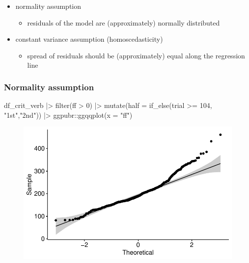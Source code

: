 \documentclass[
  letterpaper,
  DIV=11,
  numbers=noendperiod]{scrartcl}
\newenvironment{Shaded}{\begin{snugshade}}{\end{snugshade}}
\newcommand{\AttributeTok}[1]{\textcolor[rgb]{0.40,0.45,0.13}{#1}}
\newcommand{\DecValTok}[1]{\textcolor[rgb]{0.68,0.00,0.00}{#1}}
\newcommand{\FunctionTok}[1]{\textcolor[rgb]{0.28,0.35,0.67}{#1}}
\newcommand{\NormalTok}[1]{\textcolor[rgb]{0.00,0.23,0.31}{#1}}
\newcommand{\SpecialCharTok}[1]{\textcolor[rgb]{0.37,0.37,0.37}{#1}}
\newcommand{\StringTok}[1]{\textcolor[rgb]{0.13,0.47,0.30}{#1}}
\providecommand{\tightlist}{%
  \setlength{\itemsep}{0pt}\setlength{\parskip}{0pt}}\usepackage{longtable,booktabs,array}
\begin{document}
\begin{itemize}
\tightlist
\item
  normality assumption

  \begin{itemize}
  \tightlist
  \item
    residuals of the model are (approximately) normally distributed
  \end{itemize}
\item
  constant variance assumption (homoscedasticity)

  \begin{itemize}
  \tightlist
  \item
    spread of residuals should be (approximately) equal along the
    regression line
  \end{itemize}
\end{itemize}

\hypertarget{normality-assumption}{%
\subsubsection{Normality assumption}\label{normality-assumption}}

\begin{Shaded}
\begin{Highlighting}[]
\NormalTok{df\_crit\_verb }\SpecialCharTok{|\textgreater{}} 
  \FunctionTok{filter}\NormalTok{(ff }\SpecialCharTok{\textgreater{}} \DecValTok{0}\NormalTok{) }\SpecialCharTok{|\textgreater{}} 
  \FunctionTok{mutate}\NormalTok{(}\AttributeTok{half =} \FunctionTok{if\_else}\NormalTok{(trial }\SpecialCharTok{\textgreater{}=} \DecValTok{104}\NormalTok{, }\StringTok{"1st"}\NormalTok{,}\StringTok{"2nd"}\NormalTok{)) }\SpecialCharTok{|\textgreater{}} 
\NormalTok{  ggpubr}\SpecialCharTok{::}\FunctionTok{ggqqplot}\NormalTok{(}\AttributeTok{x =} \StringTok{"ff"}\NormalTok{)}
\end{Highlighting}
\end{Shaded}

\begin{figure}[H]

{\centering \includegraphics{_lin_reg1_files/figure-pdf/unnamed-chunk-30-1.pdf}

}

\end{figure}
\end{document}
